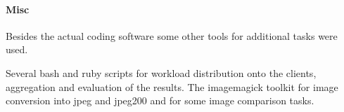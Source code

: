 \paragraph{Misc}
Besides the actual coding software some other tools for additional tasks were used.

Several bash and ruby scripts for workload distribution onto the clients, aggregation and evaluation of the results.
The imagemagick toolkit for image conversion into jpeg and jpeg200 and for some image comparison tasks.








